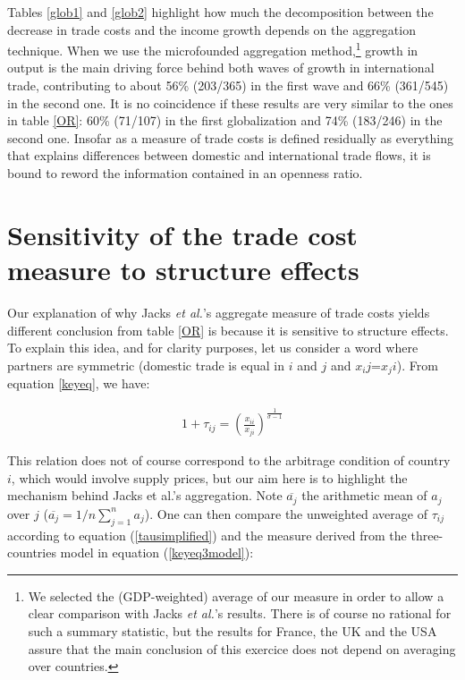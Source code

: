 \documentclass{article}
\begin{document}
Tables \ref{glob1} and \ref{glob2} highlight how much the decomposition
between the decrease in trade costs and the income growth depends on the aggregation technique. When we use the microfounded aggregation method,\footnote{We selected the (GDP-weighted) average of our measure in order
to allow a clear comparison with Jacks \textit{et al.}'s results. There
is of course no rational for such a summary statistic, but the
results for France, the UK and the USA assure that the main
conclusion of this exercice does not depend on averaging over
countries.} 
growth in output is the main driving force behind both waves of growth in
international trade, contributing to about 56\% (203/365) in
the first wave and 66\% (361/545) in the second one. It is no coincidence
if these results are very similar to the ones in table \ref{OR}: 60\% (71/107) in the first globalization and 74\% (183/246) in the second one.
Insofar as a measure of
trade costs is defined residually as everything that explains
differences between domestic and international trade flows, it
is bound to reword the information contained in an openness
ratio.

\section{\label{3} Sensitivity of the trade cost measure to
structure effects}

Our explanation of why Jacks \textit{et al.}'s aggregate measure of
trade costs yields different conclusion 
from table \ref{OR} is because it is sensitive to structure
effects. To explain this idea, and for clarity purposes, let us consider
a word where partners are symmetric (domestic trade is equal in $i$ and $j$ and $x_ij$=$x_ji$). From equation \ref{keyeq}, we have:

\begin{eqnarray}
1+\tau_{ij}= \left(\frac{x_{ii}}{x_{ji}}\right)^{\frac{1}{\sigma-1}}\label{tausimplified}
\end{eqnarray}

This relation does not of course correspond to the arbitrage
condition of country $i$, which would involve supply prices,
but our aim here is to highlight the mechanism behind Jacks et
al.'s aggregation. Note $\overline{a_j}$ the arithmetic mean
of $a_j$ over $j$ ($\overline{a_j}=1/n \sum_{j=1}^{n}a_j$). One can
then compare the unweighted average of $\tau_{ij}$ according to equation 
(\ref{tausimplified}) and the measure derived from the
three-countries model in equation (\ref{keyeq3model}):
\end{document}
